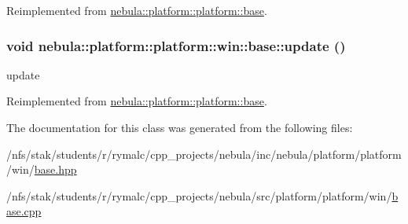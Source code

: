 Reimplemented from \hyperlink{classnebula_1_1platform_1_1platform_1_1base_ae2dafd0a663fdb8b95211c975c35c79a}{nebula::platform::platform::base}.\hypertarget{classnebula_1_1platform_1_1platform_1_1win_1_1base_a89720e3bc6dee8af7f77469c8693596e}{
\subsubsection[{update}]{\setlength{\rightskip}{0pt plus 5cm}void nebula::platform::platform::win::base::update ()}}
\label{classnebula_1_1platform_1_1platform_1_1win_1_1base_a89720e3bc6dee8af7f77469c8693596e}
update 

Reimplemented from \hyperlink{classnebula_1_1platform_1_1platform_1_1base_a9036fffff86ce314d44ab292291088c9}{nebula::platform::platform::base}.

The documentation for this class was generated from the following files:\begin{DoxyCompactItemize}
\item 
/nfs/stak/students/r/rymalc/cpp\_\-projects/nebula/inc/nebula/platform/platform/win/\hyperlink{inc_2nebula_2platform_2platform_2win_2base_8hpp}{base.hpp}\item 
/nfs/stak/students/r/rymalc/cpp\_\-projects/nebula/src/platform/platform/win/\hyperlink{src_2platform_2platform_2win_2base_8cpp}{base.cpp}\end{DoxyCompactItemize}
